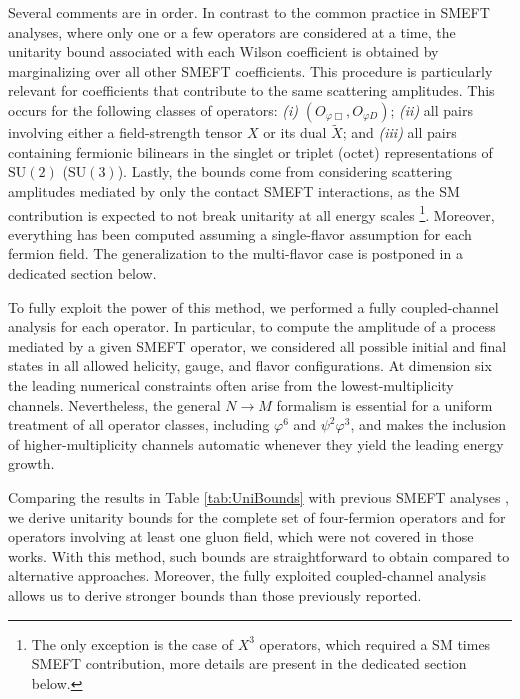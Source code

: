 \documentclass[a4paper,11pt]{article}
\begin{document}
Several comments are in order. 
In contrast to the common practice in SMEFT analyses, where only one or a few operators are considered at a time, the unitarity bound associated with each Wilson coefficient is obtained by marginalizing over all other SMEFT coefficients. This procedure is particularly relevant for coefficients that contribute to the same scattering amplitudes. This occurs for the following classes of operators: \textit{(i)} $(O_{\varphi \Box}, O_{\varphi D})$; \textit{(ii)} all pairs involving either a field-strength tensor $X$ or its dual $\widetilde X$; and \textit{(iii)} all pairs containing fermionic bilinears in the singlet or triplet (octet) representations of $\mathrm{SU}(2)$ ($\mathrm{SU}(3)$). Lastly, the bounds come from considering scattering amplitudes mediated by only the contact SMEFT interactions, as the SM contribution is expected to not break unitarity at all energy scales \footnote{The only exception is the case of $X^3$ operators, which required a SM times SMEFT contribution, more details are present in the dedicated section below.}. Moreover, everything has been computed assuming a single-flavor assumption for each fermion field. The generalization to the multi-flavor case is postponed in a dedicated section below.

To fully exploit the power of this method, we performed a fully coupled-channel analysis for each operator. 
In particular, to compute the amplitude of a process mediated by a given SMEFT operator, we considered all possible initial and final states in all allowed helicity, gauge, and flavor configurations. At dimension six the leading numerical constraints often arise from the lowest-multiplicity channels. Nevertheless, the general $N \to M$ formalism \cite{Bresciani:2025toe} is essential for a uniform treatment of all operator classes, including $\varphi^6$ and $\psi^2\varphi^3$, and makes the inclusion of higher-multiplicity channels automatic
whenever they yield the leading energy growth. 

Comparing the results in Table \ref{tab:UniBounds} with previous SMEFT analyses \cite{Corbett:2014ora,Corbett:2017qgl,Cao:2023qks}, we derive unitarity bounds for the complete set of four-fermion operators and for operators involving at least one gluon field, which were not covered in those works. With this method, such bounds are straightforward to obtain compared to alternative approaches. Moreover, the fully exploited coupled-channel analysis allows us to derive stronger bounds than those previously reported. 
\end{document}
